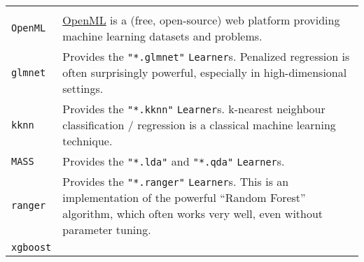 \documentclass[]{article}
\begin{document}
\begin{longtable}[]{@{}ll@{}}
\begin{minipage}[t]{0.81\columnwidth}
\end{minipage}\tabularnewline
\begin{minipage}[t]{0.13\columnwidth}\raggedright
\texttt{OpenML}\strut
\end{minipage} & \begin{minipage}[t]{0.81\columnwidth}\raggedright
\href{https://www.openml.org/}{OpenML} is a (free, open-source) web
platform providing machine learning datasets and problems.\strut
\end{minipage}\tabularnewline
\begin{minipage}[t]{0.13\columnwidth}\raggedright
\texttt{glmnet}\strut
\end{minipage} & \begin{minipage}[t]{0.81\columnwidth}\raggedright
Provides the \texttt{"*.glmnet"} \texttt{Learner}s. Penalized regression
is often surprisingly powerful, especially in high-dimensional
settings.\strut
\end{minipage}\tabularnewline
\begin{minipage}[t]{0.13\columnwidth}\raggedright
\texttt{kknn}\strut
\end{minipage} & \begin{minipage}[t]{0.81\columnwidth}\raggedright
Provides the \texttt{"*.kknn"} \texttt{Learner}s. k-nearest neighbour
classification / regression is a classical machine learning
technique.\strut
\end{minipage}\tabularnewline
\begin{minipage}[t]{0.13\columnwidth}\raggedright
\texttt{MASS}\strut
\end{minipage} & \begin{minipage}[t]{0.81\columnwidth}\raggedright
Provides the \texttt{"*.lda"} and \texttt{"*.qda"}
\texttt{Learner}s.\strut
\end{minipage}\tabularnewline
\begin{minipage}[t]{0.13\columnwidth}\raggedright
\texttt{ranger}\strut
\end{minipage} & \begin{minipage}[t]{0.81\columnwidth}\raggedright
Provides the \texttt{"*.ranger"} \texttt{Learner}s. This is an
implementation of the powerful ``Random Forest'' algorithm, which often
works very well, even without parameter tuning.\strut
\end{minipage}\tabularnewline
\begin{minipage}[t]{0.13\columnwidth}\raggedright
\texttt{xgboost}\strut
\end{minipage} & \begin{minipage}[t]{0.81\columnwidth}\raggedright

\end{minipage}
\end{longtable}
\end{document}
